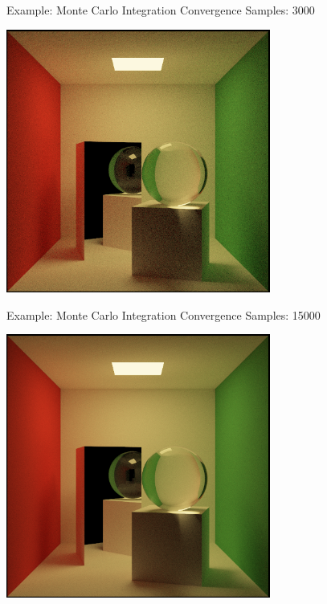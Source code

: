 \documentclass{beamer}
\begin{document}
\begin{frame}{Example: Monte Carlo Integration Convergence}
    Samples: 3000
    \begin{center}
        \includegraphics[width=0.65\textwidth]{../img/convergence/cornell-03000.png}
    \end{center}
\end{frame}

\begin{frame}{Example: Monte Carlo Integration Convergence}
    Samples: 15000
    \begin{center}
        \includegraphics[width=0.65\textwidth]{../img/convergence/cornell-15000.png}
    \end{center}
\end{frame}
\end{document}
